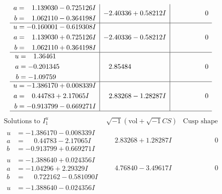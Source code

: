 \documentclass[1p]{elsarticle_modified}
\theoremstyle{definition}
\newcommand{\I}{\sqrt{-1}}
\begin{document}
$$\begin{array}{c|c|c}
\begin{aligned}
a &= \phantom{-}1.139030 - 0.725126 I \\
b &= \phantom{-}1.062110 - 0.364198 I\end{aligned}
 & -2.40336 + 0.58212 I & \phantom{-0.000000 } 0 \\ \hline\begin{aligned}
u &= -0.160001 - 0.619308 I \\
a &= \phantom{-}1.139030 + 0.725126 I \\
b &= \phantom{-}1.062110 + 0.364198 I\end{aligned}
 & -2.40336 - 0.58212 I & \phantom{-0.000000 } 0 \\ \hline\begin{aligned}
u &= \phantom{-}1.36461\phantom{ +0.000000I} \\
a &= -0.201345\phantom{ +0.000000I} \\
b &= -1.09759\phantom{ +0.000000I}\end{aligned}
 & \phantom{-}2.85484\phantom{ +0.000000I} & \phantom{-0.000000 } 0 \\ \hline\begin{aligned}
u &= -1.386170 + 0.008339 I \\
a &= \phantom{-}0.44783 + 2.17065 I \\
b &= -0.913799 - 0.669271 I\end{aligned}
 & \phantom{-}2.83268 - 1.28287 I & \phantom{-0.000000 } 0\\
 \hline 
 \end{array}$$\newpage$$\begin{array}{c|c|c}  
\text{Solutions to }I^u_{1}& \I (\text{vol} + \sqrt{-1}CS) & \text{Cusp shape}\\
 \hline 
\begin{aligned}
u &= -1.386170 - 0.008339 I \\
a &= \phantom{-}0.44783 - 2.17065 I \\
b &= -0.913799 + 0.669271 I\end{aligned}
 & \phantom{-}2.83268 + 1.28287 I & \phantom{-0.000000 } 0 \\ \hline\begin{aligned}
u &= -1.388640 + 0.024356 I \\
a &= -1.04296 + 2.29329 I \\
b &= \phantom{-}0.722162 - 0.581090 I\end{aligned}
 & \phantom{-}4.76840 - 3.49617 I & \phantom{-0.000000 } 0 \\ \hline\begin{aligned}
u &= -1.388640 - 0.024356 I \\

\end{aligned}
\end{array}$$
\end{document}
